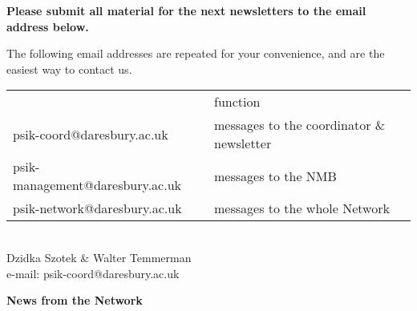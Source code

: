 \noindent
{\bf {Please submit all material for the next newsletters to the email address below.}}

\ni The following email addresses are repeated for your convenience,
and are the easiest way to contact us.\\

\noindent
{\small \bf \begin{tabular} [t] {ll}
 & function \\
psik-coord@daresbury.ac.uk & messages to the coordinator \& newsletter \\
psik-management@daresbury.ac.uk & messages to the NMB \\
psik-network@daresbury.ac.uk & messages to the whole Network \\
\end{tabular} }\\

\bigskip
\ni Dzidka Szotek \& Walter Temmerman\\
\ni e-mail: psik-coord@daresbury.ac.uk\\

\newpage
\null
\begin{center}
\LARGE {\bf News from the Network \par}
\end{center}

